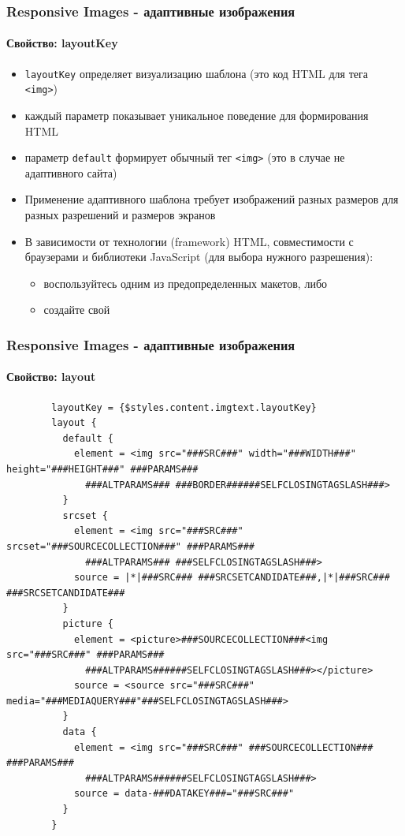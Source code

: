 \begin{frame}[fragile]
	\frametitle{Responsive Images - адаптивные изображения}
	\framesubtitle{Свойство: layoutKey}

	\begin{itemize}
		\item \texttt{layoutKey} определяет визуализацию шаблона\newline
			(это код HTML для тега \texttt{<img>})
		\item каждый параметр показывает уникальное поведение для формирования HTML
		\item параметр \texttt{default} формирует обычный тег \texttt{<img>}\newline
			(это в случае не адаптивного сайта)
		\item Применение адаптивного шаблона требует изображений разных размеров для разных разрешений и размеров экранов
		\item В зависимости от технологии (framework) HTML, совместимости с браузерами и библиотеки JavaScript (для выбора
		нужного разрешения):

			\begin{itemize}
				\item воспользуйтесь одним из предопределенных макетов, либо
				\item создайте свой
			\end{itemize}

	\end{itemize}

\end{frame}


\begin{frame}[fragile]
	\frametitle{Responsive Images - адаптивные изображения}
	\framesubtitle{Свойство: layout}

			\lstset{
				basicstyle=\tiny\ttfamily
			}

	\begin{lstlisting}
		layoutKey = {$styles.content.imgtext.layoutKey}
		layout {
		  default {
		    element = <img src="###SRC###" width="###WIDTH###" height="###HEIGHT###" ###PARAMS###
		      ###ALTPARAMS### ###BORDER######SELFCLOSINGTAGSLASH###>
		  }
		  srcset {
		    element = <img src="###SRC###" srcset="###SOURCECOLLECTION###" ###PARAMS###
		      ###ALTPARAMS### ###SELFCLOSINGTAGSLASH###>
		    source = |*|###SRC### ###SRCSETCANDIDATE###,|*|###SRC### ###SRCSETCANDIDATE###
		  }
		  picture {
		    element = <picture>###SOURCECOLLECTION###<img src="###SRC###" ###PARAMS###
		      ###ALTPARAMS######SELFCLOSINGTAGSLASH###></picture>
		    source = <source src="###SRC###" media="###MEDIAQUERY###"###SELFCLOSINGTAGSLASH###>
		  }
		  data {
		    element = <img src="###SRC###" ###SOURCECOLLECTION### ###PARAMS###
		      ###ALTPARAMS######SELFCLOSINGTAGSLASH###>
		    source = data-###DATAKEY###="###SRC###"
		  }
		}
	\end{lstlisting}

\end{frame}

